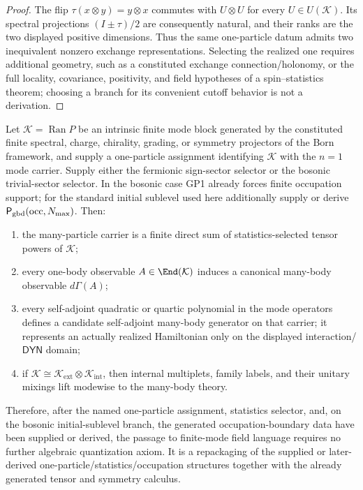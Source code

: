 \documentclass[12pt,a4paper]{article}
\begin{document}
\begin{proof}
The flip \(\tau(x\otimes y)=y\otimes x\) commutes with
\(U\otimes U\) for every \(U\in U(\mathcal K)\).  Its spectral projections
\((I\pm\tau)/2\) are consequently natural, and their ranks are the two
displayed positive dimensions.  Thus the same one-particle datum admits two
inequivalent nonzero exchange representations.  Selecting the realized one
requires additional geometry, such as a constituted exchange
connection/holonomy, or the full locality, covariance, positivity, and field
hypotheses of a spin--statistics theorem; choosing a branch for its convenient
cutoff behavior is not a derivation.
\end{proof}


\begin{theorem}
\label{p4:thm:finite-second-quantization}
Let \(\mathcal K=\operatorname{Ran}P\) be an intrinsic finite mode block
generated by the constituted finite spectral, charge, chirality, grading, or
symmetry projectors of the Born framework, and supply a one-particle
assignment identifying \(\mathcal K\) with the \(n=1\) mode carrier.
Supply either the fermionic
sign-sector selector or the bosonic trivial-sector selector.  In the bosonic
case GP1 already forces finite occupation support; for the standard initial
sublevel used here additionally supply or derive
\(\mathsf P_{\rm gbd}(\mathrm{occ},N_{\max})\).
Then:
\begin{enumerate}[label=(\roman*)]
\item the many-particle carrier is a finite direct sum of statistics-selected tensor powers of $\mathcal K$;
\item every one-body observable $A\in\End(\mathcal K)$ induces a canonical many-body observable $d\Gamma(A)$;
\item every self-adjoint quadratic or quartic polynomial in the mode
operators defines a candidate self-adjoint many-body generator on that
carrier; it represents an actually realized Hamiltonian only on the
displayed interaction/\(\mathsf{DYN}\) domain;
\item if $\mathcal K\cong \mathcal K_{\mathrm{ext}}\otimes \mathcal K_{\mathrm{int}}$, then internal multiplets, family labels, and their unitary mixings lift modewise to the many-body theory.
\end{enumerate}
Therefore, after the named one-particle assignment, statistics selector,
and, on the bosonic initial-sublevel branch, the generated occupation-boundary
data have been supplied or derived, the passage to finite-mode field language
requires no further
algebraic quantization axiom.  It is a repackaging of the supplied or
later-derived one-particle/statistics/occupation structures together with the
already generated tensor and symmetry calculus.
\end{theorem}
\end{document}
